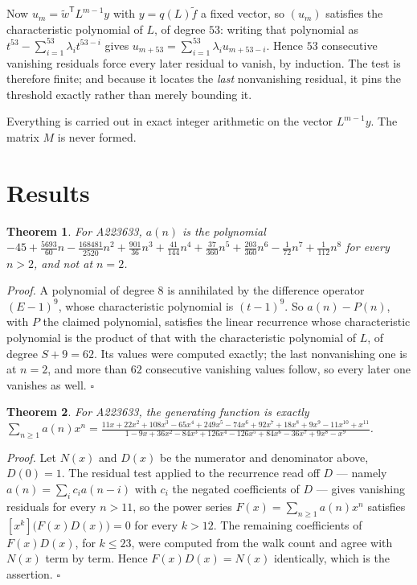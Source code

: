 \documentclass[11pt]{article}
\newtheorem{theorem}{Theorem}
\theoremstyle{definition}
\begin{document}
Now $u_m = \tilde w^{\mathsf T} L^{m-1} y$ with $y = q(L)\tilde f$ a fixed vector, so $(u_m)$ satisfies the characteristic polynomial of $L$, of degree $53$: writing that polynomial as $t^{53} - \sum_{i=1}^{53} \lambda_i t^{53-i}$ gives $u_{m+53} = \sum_{i=1}^{53} \lambda_i u_{m+53-i}$. Hence $53$ consecutive vanishing residuals force every later residual to vanish, by induction. The test is therefore finite; and because it locates the {\itshape last} nonvanishing residual, it pins the threshold exactly rather than merely bounding it.

Everything is carried out in exact integer arithmetic on the vector $L^{m-1}y$. The matrix $M$ is never formed.

\section{Results}

\begin{theorem} For A223633, $a(n)$ is the polynomial $-45 + \frac{5693}{60}n - \frac{168481}{2520}n^{2} + \frac{901}{36}n^{3} + \frac{41}{144}n^{4} + \frac{37}{360}n^{5} + \frac{203}{360}n^{6} - \frac{1}{72}n^{7} + \frac{1}{112}n^{8}$ for every $n > 2$, and not at $n = 2$.\end{theorem}

{\itshape Proof.} A polynomial of degree $8$ is annihilated by the difference operator $(E-1)^{9}$, whose characteristic polynomial is $(t-1)^{9}$. So $a(n) - P(n)$, with $P$ the claimed polynomial, satisfies the linear recurrence whose characteristic polynomial is the product of that with the characteristic polynomial of $L$, of degree $S + 9 = 62$. Its values were computed exactly; the last nonvanishing one is at $n = 2$, and more than $62$ consecutive vanishing values follow, so every later one vanishes as well. $\square$

\begin{theorem} For A223633, the generating function is exactly $\sum_{n\ge 1} a(n)x^n = \frac{11x + 22x^{2} + 108x^{3} - 65x^{4} + 249x^{5} - 74x^{6} + 92x^{7} + 18x^{8} + 9x^{9} - 11x^{10} + x^{11}}{1 - 9x + 36x^{2} - 84x^{3} + 126x^{4} - 126x^{5} + 84x^{6} - 36x^{7} + 9x^{8} - x^{9}}$.\end{theorem}

{\itshape Proof.} Let $N(x)$ and $D(x)$ be the numerator and denominator above, $D(0)=1$. The residual test applied to the recurrence read off $D$ --- namely $a(n) = \sum_i c_i a(n-i)$ with $c_i$ the negated coefficients of $D$ --- gives vanishing residuals for every $n > 11$, so the power series $F(x)=\sum_{n\ge 1}a(n)x^n$ satisfies $[x^k]\bigl(F(x)D(x)\bigr) = 0$ for every $k > 12$. The remaining coefficients of $F(x)D(x)$, for $k \le 23$, were computed from the walk count and agree with $N(x)$ term by term. Hence $F(x)D(x) = N(x)$ identically, which is the assertion. $\square$
\end{document}

